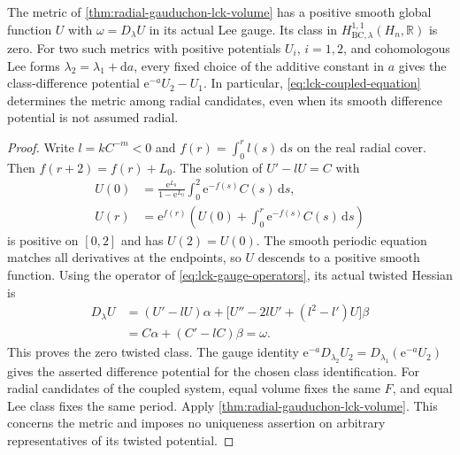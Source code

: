 \begin{proposition}\label{prop:radial-lck-positive-twisted-potential}
The metric of \cref{thm:radial-gauduchon-lck-volume} has a positive smooth global function $U$ with $\omega=D_\lambda U$ in its actual Lee gauge. Its class in $H^{1,1}_{\mathrm{BC},\lambda}(H_n,\mathbb R)$ is zero. For two such metrics with positive potentials $U_i$, $i=1,2$, and cohomologous Lee forms $\lambda_2=\lambda_1+\mathrm da$, every fixed choice of the additive constant in $a$ gives the class-difference potential $\mathrm e^{-a}U_2-U_1$. In particular, \eqref{eq:lck-coupled-equation} determines the metric among radial candidates, even when its smooth difference potential is not assumed radial.
\end{proposition}
\begin{proof}
Write $l=kC^{-m}<0$ and $f(r)=\int_0^rl(s)\,\mathrm ds$ on the real radial cover. Then $f(r+2)=f(r)+L_0$. The solution of $U'-lU=C$ with
\[
 \begin{aligned}
 U(0)&=\frac{\mathrm e^{L_0}}{1-\mathrm e^{L_0}}
       \int_0^2\mathrm e^{-f(s)}C(s)\,\mathrm ds,\\
 U(r)&=\mathrm e^{f(r)}
       \left(U(0)+\int_0^r\mathrm e^{-f(s)}C(s)\,\mathrm ds\right)
 \end{aligned}
\]
is positive on $[0,2]$ and has $U(2)=U(0)$. The smooth periodic equation matches all derivatives at the endpoints, so $U$ descends to a positive smooth function. Using the operator of \eqref{eq:lck-gauge-operators}, its actual twisted Hessian is
\[
 \begin{split}
 D_\lambda U
 &=(U'-lU)\alpha+
   \bigl[U''-2lU'+(l^2-l')U\bigr]\beta\\
 &=C\alpha+(C'-lC)\beta=\omega.
 \end{split}
\]
This proves the zero twisted class. The gauge identity
$\mathrm e^{-a}D_{\lambda_2}U_2=D_{\lambda_1}(\mathrm e^{-a}U_2)$ gives the asserted difference potential for the chosen class identification. For radial candidates of the coupled system, equal volume fixes the same $F$, and equal Lee class fixes the same period. Apply \cref{thm:radial-gauduchon-lck-volume}. This concerns the metric and imposes no uniqueness assertion on arbitrary representatives of its twisted potential.
\end{proof}

